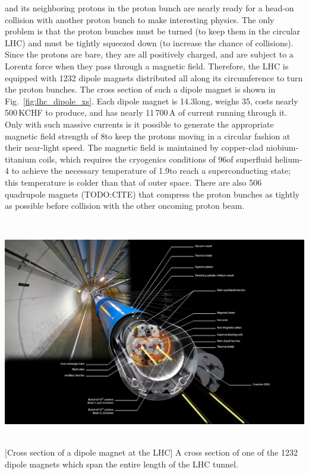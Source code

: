 \pname and its neighboring protons in the proton bunch are nearly ready for a head-on collision with another proton bunch to make interesting physics.
The only problem is that the proton bunches must be turned (to keep them in the circular LHC) and must be tightly squeezed down (to increase the chance of \pp collisions).
Since the protons are bare, they are all positively charged, and are subject to a Lorentz force when they pass through a magnetic field.
Therefore, the LHC is equipped with 1232 dipole magnets distributed all along its circumference to turn the proton bunches.
The cross section of such a dipole magnet is shown in Fig.~\ref{fig:lhc_dipole_xs}.
Each dipole magnet is 14.3\meter long, weighs 35\tonne, costs nearly 500\,KCHF to produce, and has nearly 11\,700\,A of current running through it.  %
Only with such massive currents is it possible to generate the appropriate magnetic field strength of 8\tesla to keep the protons moving in a circular fashion at their near-light speed. 
The magnetic field is maintained by copper-clad niobium-titanium coils, which requires the cryogenics conditions of 96\tonne of superfluid helium-4 to achieve the necessary temperature of 1.9\kelvin to reach a superconducting state; 
this temperature is colder than that of outer space.
There are also 506 quadrupole magnets (TODO:CITE) that compress the proton bunches as tightly as possible before collision with the other oncoming proton beam.
\begin{multiFigure}
\centering
    \includegraphics[height=10cm,keepaspectratio]{figures/lhc/lhc_dipole_xs.jpg}
        [Cross section of a dipole magnet at the LHC]
        {A cross section of one of the 1232 dipole magnets which span the entire length of the LHC tunnel.} 
    \label{fig:lhc_dipole_xs}
\end{multiFigure}

